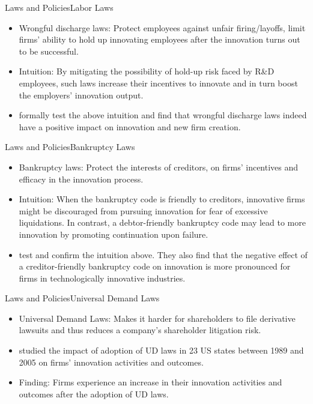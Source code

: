 \documentclass{beamer}
\begin{document}
    \begin{frame}{Laws and Policies}{Labor Laws}
        \vspace{-1cm}
        \begin{itemize}
            \item Wrongful discharge laws: Protect employees against unfair firing/layoffs, limit firms' ability to hold up innovating employees after the innovation turns out to be successful.
            \item Intuition: By mitigating the possibility of hold-up risk faced by R\&D employees, such laws increase their incentives to innovate and in turn boost the employers' innovation output.
            \item \citet{ABS2014WrongfulDischargeLaws} formally test the above intuition and find that wrongful discharge laws indeed have a positive impact on innovation and new firm creation.
        \end{itemize}
    \end{frame}

    \begin{frame}{Laws and Policies}{Bankruptcy Laws}
        \vspace{-1cm}
        \begin{itemize}
            \item Bankruptcy laws: Protect the interests of creditors, on firms' incentives and efficacy in the innovation process.
            \item Intuition: When the bankruptcy code is friendly to creditors, innovative firms might be discouraged from pursuing innovation for fear of excessive liquidations. In contrast, a debtor-friendly bankruptcy code may lead to more innovation by promoting continuation upon failure.
            \item \citet{AS2009BankruptcyCodesInnovation} test and confirm the intuition above. They also find that the negative effect of a creditor-friendly bankruptcy code on innovation is more pronounced for firms in technologically innovative industries.
        \end{itemize}
    \end{frame}

    \begin{frame}{Laws and Policies}{Universal Demand Laws}
        \vspace{-1cm}
        \begin{itemize}
            \item Universal Demand Laws: Makes it harder for shareholders to file derivative lawsuits and thus reduces a company's shareholder litigation risk.
            \item \citet{LLM2021ShareholderLitigationCorporate} studied the impact of adoption of UD laws in 23 US states between 1989 and 2005 on firms' innovation activities and outcomes.
            \item Finding: Firms experience an increase in their innovation activities and outcomes after the adoption of UD laws.
        \end{itemize}
    \end{frame}
\end{document}
